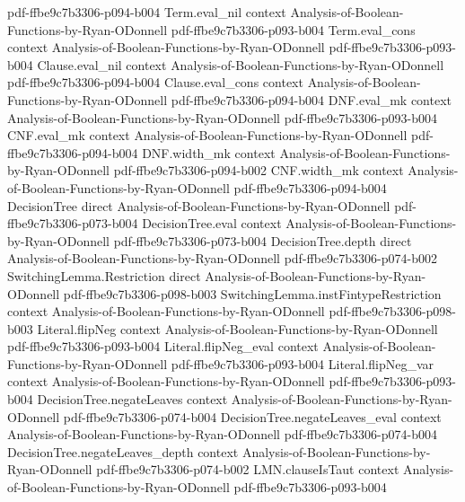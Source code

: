 \begin{lemma}
  {pdf-ffbe9c7b3306-p094-b004}
\proofstep
  {Term.eval_nil}
  {context}
  {Analysis-of-Boolean-Functions-by-Ryan-ODonnell}
  {pdf-ffbe9c7b3306-p093-b004}
\proofstep
  {Term.eval_cons}
  {context}
  {Analysis-of-Boolean-Functions-by-Ryan-ODonnell}
  {pdf-ffbe9c7b3306-p093-b004}
\proofstep
  {Clause.eval_nil}
  {context}
  {Analysis-of-Boolean-Functions-by-Ryan-ODonnell}
  {pdf-ffbe9c7b3306-p094-b004}
\proofstep
  {Clause.eval_cons}
  {context}
  {Analysis-of-Boolean-Functions-by-Ryan-ODonnell}
  {pdf-ffbe9c7b3306-p094-b004}
\proofstep
  {DNF.eval_mk}
  {context}
  {Analysis-of-Boolean-Functions-by-Ryan-ODonnell}
  {pdf-ffbe9c7b3306-p093-b004}
\proofstep
  {CNF.eval_mk}
  {context}
  {Analysis-of-Boolean-Functions-by-Ryan-ODonnell}
  {pdf-ffbe9c7b3306-p094-b004}
\proofstep
  {DNF.width_mk}
  {context}
  {Analysis-of-Boolean-Functions-by-Ryan-ODonnell}
  {pdf-ffbe9c7b3306-p094-b002}
\proofstep
  {CNF.width_mk}
  {context}
  {Analysis-of-Boolean-Functions-by-Ryan-ODonnell}
  {pdf-ffbe9c7b3306-p094-b004}
\proofstep
  {DecisionTree}
  {direct}
  {Analysis-of-Boolean-Functions-by-Ryan-ODonnell}
  {pdf-ffbe9c7b3306-p073-b004}
\proofstep
  {DecisionTree.eval}
  {context}
  {Analysis-of-Boolean-Functions-by-Ryan-ODonnell}
  {pdf-ffbe9c7b3306-p073-b004}
\proofstep
  {DecisionTree.depth}
  {direct}
  {Analysis-of-Boolean-Functions-by-Ryan-ODonnell}
  {pdf-ffbe9c7b3306-p074-b002}
\proofstep
  {SwitchingLemma.Restriction}
  {direct}
  {Analysis-of-Boolean-Functions-by-Ryan-ODonnell}
  {pdf-ffbe9c7b3306-p098-b003}
\proofstep
  {SwitchingLemma.instFintypeRestriction}
  {context}
  {Analysis-of-Boolean-Functions-by-Ryan-ODonnell}
  {pdf-ffbe9c7b3306-p098-b003}
\proofstep
  {Literal.flipNeg}
  {context}
  {Analysis-of-Boolean-Functions-by-Ryan-ODonnell}
  {pdf-ffbe9c7b3306-p093-b004}
\proofstep
  {Literal.flipNeg_eval}
  {context}
  {Analysis-of-Boolean-Functions-by-Ryan-ODonnell}
  {pdf-ffbe9c7b3306-p093-b004}
\proofstep
  {Literal.flipNeg_var}
  {context}
  {Analysis-of-Boolean-Functions-by-Ryan-ODonnell}
  {pdf-ffbe9c7b3306-p093-b004}
\proofstep
  {DecisionTree.negateLeaves}
  {context}
  {Analysis-of-Boolean-Functions-by-Ryan-ODonnell}
  {pdf-ffbe9c7b3306-p074-b004}
\proofstep
  {DecisionTree.negateLeaves_eval}
  {context}
  {Analysis-of-Boolean-Functions-by-Ryan-ODonnell}
  {pdf-ffbe9c7b3306-p074-b004}
\proofstep
  {DecisionTree.negateLeaves_depth}
  {context}
  {Analysis-of-Boolean-Functions-by-Ryan-ODonnell}
  {pdf-ffbe9c7b3306-p074-b002}
\proofstep
  {LMN.clauseIsTaut}
  {context}
  {Analysis-of-Boolean-Functions-by-Ryan-ODonnell}
  {pdf-ffbe9c7b3306-p093-b004}
\proofstep

\end{lemma}

